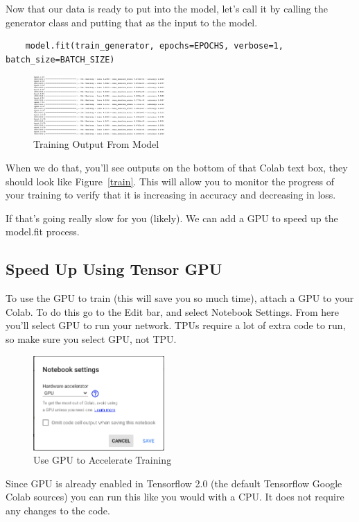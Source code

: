 \documentclass{article}
\begin{document}
Now that our data is ready to put into the model, let's call it by calling the generator class and putting that as the input to the model. 

\begin{verbatim}
    model.fit(train_generator, epochs=EPOCHS, verbose=1, batch_size=BATCH_SIZE)
\end{verbatim}

\begin{figure}[h!]
\centering
\includegraphics[width=50mm]{TrainingOutput.png}
\caption{Training Output From Model}
\label{fig:train}
\end{figure}

When we do that, you'll see outputs on the bottom of that Colab text box, they should look like Figure~\ref{train}. This will allow you to monitor the progress of your training to verify that it is increasing in accuracy and decreasing in loss. 

If that's going really slow for you (likely). We can add a GPU to speed up the model.fit process.

 \subsection{Speed Up Using Tensor GPU}
 
 To use the GPU to train (this will save you so much time), attach a GPU to your Colab. To do this go to the Edit bar, and select Notebook Settings. From here you'll select GPU to run your network. TPUs require a lot of extra code to run, so make sure you select GPU, not TPU.
 
\begin{figure}[h!]
\centering
\includegraphics[width=50mm]{GPUAccel.png}
\caption{Use GPU to Accelerate Training}
\label{fig:gpu}
\end{figure}
 
 Since GPU is already enabled in Tensorflow 2.0 (the default Tensorflow Google Colab sources) you can run this like you would with a CPU. It does not require any changes to the code. 
  
\end{document}
